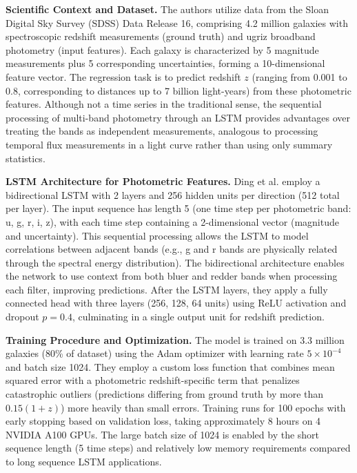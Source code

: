 \documentclass[letterpaper]{article} %
\begin{document}
\textbf{Scientific Context and Dataset.} The authors utilize data from the Sloan Digital Sky Survey (SDSS) Data Release 16, comprising 4.2 million galaxies with spectroscopic redshift measurements (ground truth) and ugriz broadband photometry (input features). Each galaxy is characterized by 5 magnitude measurements plus 5 corresponding uncertainties, forming a 10-dimensional feature vector. The regression task is to predict redshift $z$ (ranging from  0.001 to 0.8, corresponding to distances up to 7 billion light-years) from these photometric features. Although not a time series in the traditional sense, the sequential processing of multi-band photometry through an LSTM provides advantages over treating the bands as independent measurements, analogous to processing temporal flux measurements in a light curve rather than using only summary statistics.

\textbf{LSTM Architecture for Photometric Features.} Ding et al. employ a bidirectional LSTM with 2 layers and 256 hidden units per direction (512 total per layer). The input sequence has length 5 (one time step per photometric band: u, g, r, i, z), with each time step containing a 2-dimensional vector (magnitude and uncertainty). This sequential processing allows the LSTM to model correlations between adjacent bands (e.g., g and r bands are physically related through the spectral energy distribution). The bidirectional architecture enables the network to use context from both bluer and redder bands when processing each filter, improving predictions. After the LSTM layers, they apply a fully connected head with three layers (256, 128, 64 units) using ReLU activation and dropout $p=0.4$, culminating in a single output unit for redshift prediction.

\textbf{Training Procedure and Optimization.} The model is trained on 3.3 million galaxies (80\% of dataset) using the Adam optimizer with learning rate $5 \times 10^{-4}$ and batch size 1024. They employ a custom loss function that combines mean squared error with a photometric redshift-specific term that penalizes catastrophic outliers (predictions differing from ground truth by more than $0.15(1+z)$) more heavily than small errors. Training runs for 100 epochs with early stopping based on validation loss, taking approximately 8 hours on 4 NVIDIA A100 GPUs. The large batch size of 1024 is enabled by the short sequence length (5 time steps) and relatively low memory requirements compared to long sequence LSTM applications.
\end{document}
